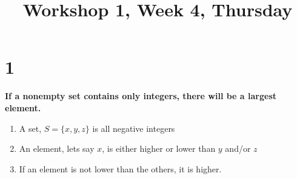 \documentclass[danish,english,10pt,a4paper]{article}
\title{Workshop 1, Week 4, Thursday}
\begin{document}
\maketitle

\section*{1}
\textbf{If a nonempty set contains only integers, there will be a largest element.}
\begin{enumerate}
\item A set, $S = \{x, y ,z\}$ is all negative integers
\item An element, lets say $x$, is either higher or lower than $y$ and/or $z$
\item If an element is not lower than the others, it is higher.
\end{enumerate}
\end{document}
